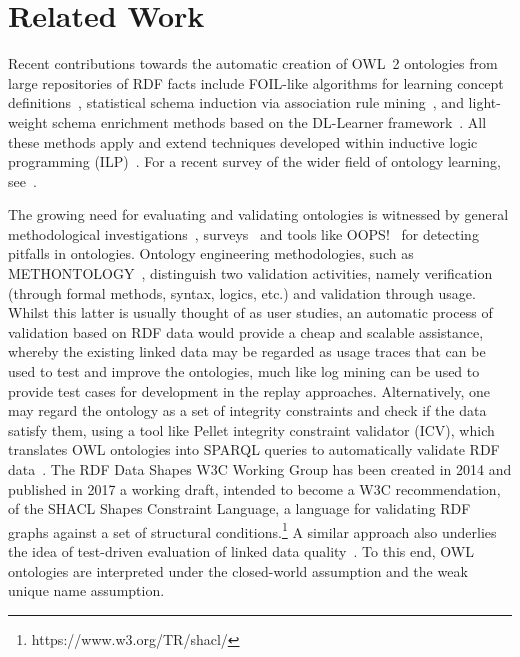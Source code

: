 \documentclass[review]{elsarticle}
\theoremstyle{definition}
\begin{document}
\section{Related Work}\label{related-work}

Recent contributions towards the automatic creation of OWL~2 ontologies
from large repositories of RDF facts include
FOIL-like algorithms for learning concept definitions~\cite{FanizziDAmatoEsposito2008},
statistical schema induction via association rule mining~\cite{FleischhackerVoelkerStuckenschmidt2012},
and light-weight schema enrichment methods based on the DL-Learner
framework~\cite{HellmannLehmannAuer2009,BuehmannLehmann2012}.
All these methods apply and extend techniques developed within inductive logic programming
(ILP)~\cite{ILPat20}. For a recent survey of the wider field of ontology learning,
see~\cite{LehmannVoelker2014}.

The growing need for evaluating and validating ontologies is witnessed by general methodological investigations~\cite{GangemiCatenacciCiaramitaLehmann2005,GangemiCatenacciCiaramitaLehmann2006}, 
surveys~\cite{TartirBudakArpinarSheth2007} and tools like OOPS!~\cite{PovedaSuarezGomez2012}
for detecting pitfalls in ontologies.
Ontology engineering methodologies, such as METHONTOLOGY~\cite{FernandezGomezJuristo1997},
distinguish two validation activities, namely verification (through formal methods, syntax, logics, etc.)
and validation through usage. Whilst this latter is usually thought of as user studies,
an automatic process of validation based on RDF data would provide a cheap and scalable assistance,
whereby the existing linked data may be regarded as usage traces that can be used
to test and improve the ontologies, much like log mining can be used to provide
test cases for development in the replay approaches.
Alternatively, one may regard the ontology as a set of integrity constraints and check if the
data satisfy them, using a tool like Pellet integrity constraint validator (ICV),
which translates OWL ontologies into SPARQL queries to automatically validate RDF data~\cite{SirinTao2009}. 
The RDF Data Shapes W3C Working Group has been created in 2014 and published in 2017 a working draft, intended to become a W3C recommendation, of the SHACL Shapes Constraint Language, a language for validating RDF graphs against a set of structural conditions.\footnote{https://www.w3.org/TR/shacl/}
A similar approach also underlies the idea of test-driven evaluation of linked data 
quality~\cite{KontokostasWestphalAuerHellmannLehmannCornelissen2014}.
To this end, OWL ontologies are interpreted under the closed-world assumption and
the weak unique name assumption. 
\end{document}
